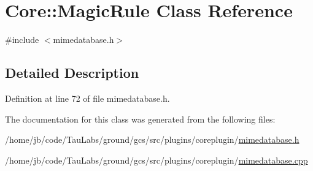 \hypertarget{class_core_1_1_magic_rule}{\section{\-Core\-:\-:\-Magic\-Rule \-Class \-Reference}
\label{class_core_1_1_magic_rule}
}


{\ttfamily \#include $<$mimedatabase.\-h$>$}



\subsection{\-Detailed \-Description}


\-Definition at line 72 of file mimedatabase.\-h.



\-The documentation for this class was generated from the following files\-:\begin{DoxyCompactItemize}
\item 
/home/jb/code/\-Tau\-Labs/ground/gcs/src/plugins/coreplugin/\hyperlink{mimedatabase_8h}{mimedatabase.\-h}\item 
/home/jb/code/\-Tau\-Labs/ground/gcs/src/plugins/coreplugin/\hyperlink{mimedatabase_8cpp}{mimedatabase.\-cpp}\end{DoxyCompactItemize}
